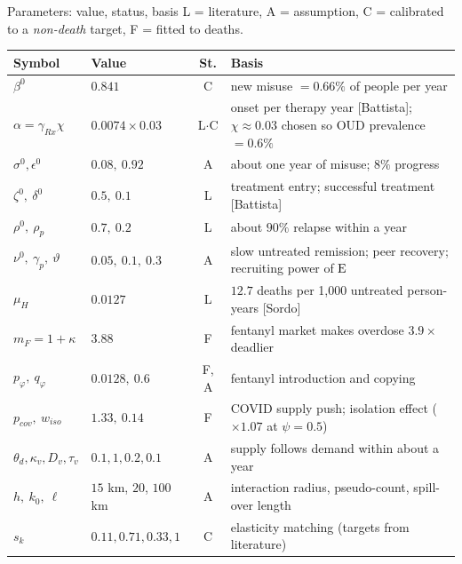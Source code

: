 ﻿\documentclass[9pt,aspectratio=169]{beamer}
\begin{document}
\begin{frame}{Parameters: value, status, basis}
 \scriptsize
 L = literature, A = assumption, C = calibrated to a \emph{non-death} target, F = fitted to deaths.
 \par\vspace{3pt}
 \renewcommand{\arraystretch}{1.12}
 \begin{tabularx}{\textwidth}{@{}l l c X@{}}
 \toprule
 Symbol & Value & St. & Basis\\\midrule
 $\beta^0$ & $0.841$ & C & new misuse $=0.66\%$ of people per year\\
 $\alpha=\gamma_{Rx}\chi$ & $0.0074\times0.03$ & L$\cdot$C & onset per therapy year [Battista]; $\chi\approx0.03$ chosen so OUD prevalence $=0.6\%$\\
 $\sigma^0,\epsilon^0$ & $0.08,\ 0.92$ & A & about one year of misuse; $8\%$ progress\\
 $\zeta^0,\ \delta^0$ & $0.5,\ 0.1$ & L & treatment entry; successful treatment [Battista]\\
 $\rho^0,\ \rho_p$ & $0.7,\ 0.2$ & L & about $90\%$ relapse within a year\\
 $\nu^0,\ \gamma_p,\ \vartheta$ & $0.05,\ 0.1,\ 0.3$ & A & slow untreated remission; peer recovery; recruiting power of $\mathrm{E}$\\
 $\mu_H$ & $0.0127$ & L & $12.7$ deaths per 1{,}000 untreated person-years [Sordo]\\
 $m_F=1+\kappa$ & $3.88$ & F & fentanyl market makes overdose $3.9\times$ deadlier\\
 $p_\varphi,\ q_\varphi$ & $0.0128,\ 0.6$ & F, A & fentanyl introduction and copying\\
 $p_{cov},\ w_{iso}$ & $1.33,\ 0.14$ & F & COVID supply push; isolation effect ($\times1.07$ at $\psi=0.5$)\\
 $\theta_d,\kappa_v,D_v,\tau_v$ & $0.1,1,0.2,0.1$ & A & supply follows demand within about a year\\
 $h,\ k_0,\ \ell$ & $15$ km, $20$, $100$ km & A & interaction radius, pseudo-count, spill-over length\\
 $s_k$ & $0.11,0.71,0.33,1$ & C & elasticity matching (targets from literature)\\
 \bottomrule
 \end{tabularx}
\end{frame}

\end{document}
